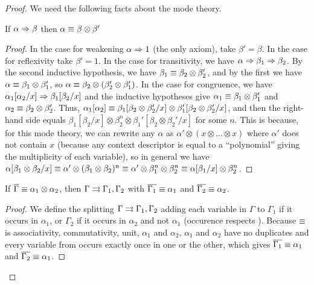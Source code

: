 \begin{proof}
We need the following facts about the mode theory.  

\begin{lemma} \label{lem:affine-mode-1}
If $\alpha \Rightarrow \beta$ then $\alpha \equiv \beta \otimes \beta'$
\end{lemma}
\begin{proof}

In the case for weakening $\alpha \Rightarrow 1$ (the only axiom), take
$\beta' = \beta$.  In the case for reflexivity take $\beta' =
1$.  In the case for transitivity, we have $\alpha \Rightarrow \beta_1
\Rightarrow \beta_2$.  By the second inductive hypothesis, we have
$\beta_1 \equiv \beta_2 \otimes \beta_2'$, and by the first we have
$\alpha \equiv \beta_1 \otimes \beta_1'$, so 
$\alpha \equiv \beta_2 \otimes (\beta_2' \otimes \beta_1')$.  
In the case for congruence, we have
$\alpha_1[\alpha_2/x] \Rightarrow \beta_1[\beta_2/x]$
and the inductive hypotheses give
    $\alpha_1 \equiv \beta_1 \otimes \beta_1'$
and $\alpha_2 \equiv \beta_2 \otimes \beta_2'$.  
Thus, 
$\alpha_1[\alpha_2] \equiv \beta_1[\beta_2 \otimes \beta_2'/x] \otimes \beta_1'[\beta_2 \otimes \beta_2'/x]$,
and then the right-hand side equals 
$\beta_1[\beta_2/x] \otimes \beta_2^n \otimes \beta_1'[\beta_2 \otimes \beta_2'/x]$
for some $n$.  
This is because, 
for this mode theory, we can rewrite any $\alpha$ as $\alpha' \otimes (x
\otimes \ldots \otimes x)$ where $\alpha'$ does not contain $x$ (because
any context descriptor is equal to a ``polynomial'' giving the
multiplicity of each variable), so in general we have $\alpha[\beta_1
  \otimes \beta_2/x] \equiv \alpha' \otimes (\beta_1 \otimes \beta_2)^n
\equiv \alpha' \otimes \beta_1^n \otimes \beta_2^n \equiv \alpha[\beta_1/x]
\otimes \beta_2^n$.
\end{proof}

\begin{lemma} \label{lem:affine-mode-5}
If $\overline{\Gamma} \equiv \alpha_1 \otimes \alpha_2$, 
then $\Gamma \rightrightarrows \Gamma_1,\Gamma_2$ with 
$\overline{\Gamma_1} \equiv \alpha_1$ 
and $\overline{\Gamma_2} \equiv \alpha_2$.  
\end{lemma}
\begin{proof}
We define the splitting $\Gamma \rightrightarrows \Gamma_1,\Gamma_2$ adding each
variable in $\Gamma$ to $\Gamma_1$ if it occurs in $\alpha_1$, or
$\Gamma_2$ if it occurs in $\alpha_2$ and not $\alpha_1$ (occurence
respects \deq).  Because $\equiv$ is associativity, commutativity, unit,
$\alpha_1$ and $\alpha_2$, $\alpha_1$ and $\alpha_2$ have no duplicates
and every variable from \vars{\Gamma} occurs exactly once in one or the
other, which gives $\overline{\Gamma_1} \equiv \alpha_1$ and $\overline{\Gamma_2}
\equiv \alpha_1$.
\end{proof}


\end{proof}
